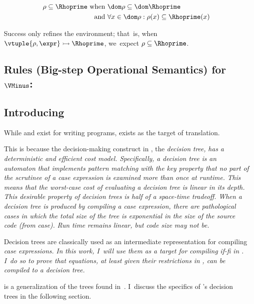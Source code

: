 \documentclass[manuscript,screen,review, 12pt, nonacm]{acmart}
\begin{document}
    \begin{align*}
    \rho \subseteq \Rhoprime \text{ when }&\dom\rho  \subseteq \dom \Rhoprime\\
    \text{ and } &\forall x \in \dom \rho: \rho(x) \subseteq \Rhoprime(x)
    \end{align*}
    
    \medskip
        
    Success only refines the environment; that~is, when ${\vtuple{\rho, \expr}}
    \rightarrowtail{} {\Rhoprime}$, we~expect $\rho \subseteq \Rhoprime$.
    
    \vfilbreak
    
    \subsection{Rules (Big-step Operational Semantics) for $\VMinus$:}
    \label{vmsemantics}
    \vmsemantics

\subsection{Introducing \D}
\label{d}

While \PPlus and \VMinus exist for writing programs, \D exists as the target
of translation. 

This is because the decision-making construct in \D, the \it{decision tree}, has
a deterministic and efficient cost model. Specifically, a decision tree is an
automaton that implements pattern matching with the key property that no part of
the scrutinee of a \it{case} expression is examined more than once at runtime.
This means that the worst-case cost of evaluating a decision tree is linear in
its depth. This desirable property of decision trees is half of a space-time
tradeoff. When a decision tree is produced by compiling a \it{case} expression,
there are pathological cases in which the total size of the tree is exponential
in the size of the source code (from \it{case}). Run time remains linear, but
code size may not be. 

Decision trees are classically used as an intermediate representation for
compiling \it{case} expressions. In this work, I~will use them as a target for
compiling \it{if-fi} in \VMinus. I~do so to prove that equations, at least given
their restrictions in \VMinus, can be compiled to a decision tree. 

\D is a generalization of the trees found in~\citet{maranget}. I~discuss the
specifics of \D's decision trees in the following section. 
\end{document}
